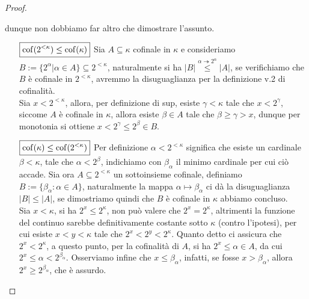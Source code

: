 \begin{proof}
\begin{itemize}
\[			\]
		dunque non dobbiamo far altro che dimostrare l'assunto.
		\begin{itemize}
			\item[$\boxed{\operatorname{cof}(2^{<\kappa}) \leq \operatorname{cof}(\kappa)}$] Sia $A \subseteq \kappa$ cofinale in $\kappa$ e consideriamo $B:=\{2^{\alpha} | \alpha \in A\}\subseteq 2^{<\kappa}$, naturalmente si ha $|B| \overset{\alpha \twoheadrightarrow 2^{\alpha}}{\leq} |A|$, se verifichiamo che $B$ è cofinale in $2^{<\kappa}$, avremmo la disuguaglianza per la definizione v.2 di cofinalità.\\
			Sia $x < 2^{<\kappa}$, allora, per definizione di sup, esiste $\gamma < \kappa$ tale che $x < 2^\gamma$, siccome $A$ è cofinale in $\kappa$, allora esiste $\beta \in A$ tale che $\beta \geq \gamma > x$, dunque per monotonia si ottiene $x < 2^\gamma \leq 2^\beta \in B$.
			\item[$\boxed{\operatorname{cof}(\kappa) \leq \operatorname{cof}(2^{<\kappa})}$] Per definizione $\alpha < 2^{<\kappa}$ significa che esiste un cardinale $\beta < \kappa$, tale che $\alpha < 2^\beta$, indichiamo con $\beta_\alpha$ il minimo cardinale per cui ciò accade.
			Sia ora $A \subseteq 2^{<\kappa}$ un sottoinsieme cofinale, definiamo $B:=\{\beta_\alpha : \alpha \in A\}$, naturalmente la mappa $\alpha \mapsto \beta_\alpha$ ci dà la disuguaglianza $|B| \leq |A|$, se dimostriamo quindi che $B$ è cofinale in $\kappa$ abbiamo concluso.\\
			Sia $x < \kappa$, si ha $2^x \leq 2^\kappa$, non può valere che $2^x = 2^\kappa$, altrimenti la funzione del continuo sarebbe definitivamente costante sotto $\kappa$ (contro l'ipotesi), per cui esiste $x < y < \kappa$ tale che $2^x < 2^y < 2^\kappa$. Quanto detto ci assicura che $2^x < 2^\kappa$,
			a questo punto, per la cofinalità di $A$, si ha $2^x \leq \alpha \in A$, da cui $2^x \leq \alpha < 2^{\beta_\alpha}$. Osserviamo infine che $x \leq \beta_\alpha$, infatti, se fosse $x > \beta_\alpha$, allora $2^x \geq 2^{\beta_\alpha}$, che è assurdo.
		\end{itemize}
	\end{itemize}
\end{proof}